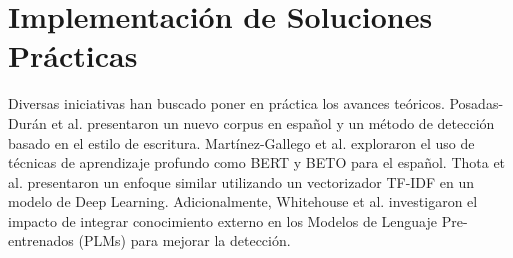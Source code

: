 \begin{table}[h!]
\centering
{}
\caption{Artículos relacionados con la investigación y desarrollo de métodos de detección.}
\label{tab:metodos_deteccion}
\end{table}

\section{Implementación de Soluciones Prácticas}
Diversas iniciativas han buscado poner en práctica los avances teóricos. Posadas-Durán et al. \cite{posadas2019detection} presentaron un nuevo corpus en español y un método de detección basado en el estilo de escritura. Martínez-Gallego et al. \cite{martinez2021fake} exploraron el uso de técnicas de aprendizaje profundo como BERT y BETO para el español. Thota et al. \cite{thota2018fake} presentaron un enfoque similar utilizando un vectorizador TF-IDF en un modelo de Deep Learning. Adicionalmente, Whitehouse et al. \cite{whitehouse2022evaluation} investigaron el impacto de integrar conocimiento externo en los Modelos de Lenguaje Pre-entrenados (PLMs) para mejorar la detección.

